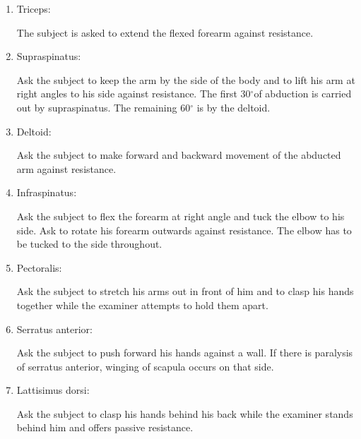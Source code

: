 \documentclass[a4paper,12pt,openany,twoside]{book}
\begin{document}
\begin{enumerate}
{}
\item{ Triceps: 
\par
The subject is asked to extend the flexed forearm against resistance.
}
\item{ Supraspinatus: 
\par
Ask the subject to keep the arm by the side of the body and to lift his arm at right angles to his side against resistance. The first 30$^\circ$of abduction is carried out by supraspinatus. The remaining 60$^\circ$ is by the deltoid.
}
\item{ Deltoid: 
\par
Ask the subject to make forward and backward movement of the abducted arm against resistance.
}
\item{ Infraspinatus: 
\par
Ask the subject to flex the forearm at right angle and tuck the elbow to his side. Ask to rotate his forearm outwards against resistance. The elbow has to be tucked to the side throughout.
}
\item{ Pectoralis: 
\par
Ask the subject to stretch his arms out in front of him and to clasp his hands together while the examiner attempts to hold them apart.
}
\item{ Serratus anterior: 
\par
Ask the subject to push forward his hands against a wall. If there is paralysis of serratus anterior, winging of scapula occurs on that side.
}
\item{ Lattisimus dorsi: 
\par
Ask the subject to clasp his hands behind his back while the examiner stands behind him and offers passive resistance.
}	
\end{enumerate}
\end{document}
